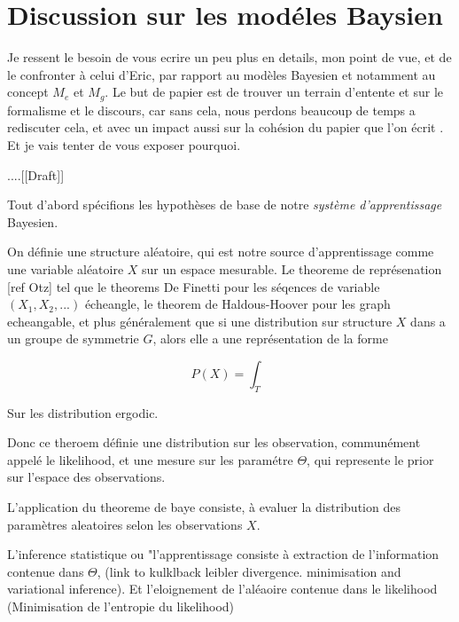 \documentclass[]{article}
\date{}
\begin{document}
\section{Discussion sur les modéles
Baysien}\label{discussion-sur-les-moduxe9les-baysien}

Je ressent le besoin de vous ecrire un peu plus en details, mon point de
vue, et de le confronter à celui d'Eric, par rapport au modèles Bayesien
et notamment au concept \(M_e\) et \(M_g\). Le but de papier est de
trouver un terrain d'entente et sur le formalisme et le discours, car
sans cela, nous perdons beaucoup de temps a rediscuter cela, et avec un
impact aussi sur la cohésion du papier que l'on écrit . Et je vais
tenter de vous exposer pourquoi.

....[[Draft]]

Tout d'abord spécifions les hypothèses de base de notre \emph{système d'apprentissage} Bayesien.

On définie une structure aléatoire, qui est notre source d'apprentissage comme une variable aléatoire $X$ sur un espace mesurable. Le theoreme de représenation [ref Otz] tel que le theorems De Finetti pour les séqences de variable $(X_1, X_2,...)$ écheangle, le theorem de Haldous-Hoover pour les graph echeangable, et plus généralement que si une distribution sur structure $X$ dans a un groupe de symmetrie $G$, alors elle a une représentation de la forme

\begin{equation}
    P(X) = \int_T
\end{equation}

Sur les distribution ergodic.

Donc ce theroem définie une distribution sur les observation, communément appelé le likelihood, et une mesure sur les paramétre $\Theta$, qui represente le prior sur l'espace des observations. 

L'application du theoreme de baye consiste, à evaluer la distribution des paramètres aleatoires selon les observations $X$. 

L'inference statistique ou "l'apprentissage consiste à extraction de l'information contenue dans $\Theta$, (link to kulklback leibler divergence. minimisation and variational inference). Et l'eloignement de l'aléaoire contenue dans le likelihood (Minimisation de l'entropie du likelihood)
\end{document}
